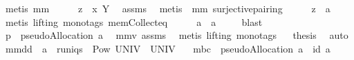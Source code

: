 \begin{isabellebody}
\ {\isacharparenleft}metis\ mm{}{}{\isacharparenright}\isanewline
\ \ \isamarkupfalse%
\ \isamarkupfalse%
\ {\isachardoublequoteopen}z\ {\isacharequal}\ {\isacharparenleft}{\isacharquery}x{\isacharcomma}\ {\isacharquery}Y{\isacharparenright}{\isachardoublequoteclose}\ \isamarkupfalse%
\ assms\ \isamarkupfalse%
\ {\isacharparenleft}metis\ {\isachardoublequoteopen}{}{\isachardoublequoteclose}\ mm{}{}\ surjective{\isacharunderscore}pairing{\isacharparenright}\isanewline
\ \ \isamarkupfalse%
\ \isamarkupfalse%
\ {\isachardoublequoteopen}z\ {\isasymin}\ {\isacharquery}a{\isachardoublequoteclose}\ \isamarkupfalse%
\ {}\ \isamarkupfalse%
\ {\isacharparenleft}metis\ {\isacharparenleft}lifting{\isacharcomma}\ mono{\isacharunderscore}tags{\isacharparenright}\ mem{\isacharunderscore}Collect{\isacharunderscore}eq{\isacharparenright}\isanewline
\ \ \isacommand{{\isacharbraceright}}\isamarkupfalse%
\isanewline
{}\isamarkupfalse%
\ \isamarkupfalse%
\ {\isachardoublequoteopen}a\ {\isacharequal}\ {\isacharquery}a{\isachardoublequoteclose}\ \isamarkupfalse%
\ {}\ \isamarkupfalse%
\ blast\isanewline
{}\isamarkupfalse%
\ \isamarkupfalse%
\ {\isachardoublequoteopen}{\isacharquery}p\ {\isacharequal}\ pseudoAllocation\ a{\isachardoublequoteclose}\ \isamarkupfalse%
\ mm{}{}v\ assms\ \isamarkupfalse%
\ {\isacharparenleft}metis\ {\isacharparenleft}lifting{\isacharcomma}\ mono{\isacharunderscore}tags{\isacharparenright}{\isacharparenright}\isanewline
{}\isamarkupfalse%
\ \isamarkupfalse%
\ {\isacharquery}thesis\ \isamarkupfalse%
\ auto\isanewline
{}\isamarkupfalse%
%
\endisatagproof
{\isafoldproof}%
%
\isadelimproof
\isanewline
%
\endisadelimproof
{}\isamarkupfalse%
\ mm{}{}dd{\isacharcolon}\ \ {\isachardoublequoteopen}a\ {\isasymin}\ runiqs\ {\isasyminter}\ Pow\ {\isacharparenleft}UNIV\ {\isasymtimes}\ {\isacharparenleft}UNIV\ {\isacharminus}\ {\isacharbraceleft}{\isacharbraceleft}{\isacharbraceright}{\isacharbraceright}{\isacharparenright}{\isacharparenright}{\isachardoublequoteclose}\ \isanewline
{\isachardoublequoteopen}{\isacharparenleft}mbc\ {\isasymcirc}\ pseudoAllocation{\isacharparenright}\ a\ {\isacharequal}\ id\ a{\isachardoublequoteclose}%

\end{isabellebody}

